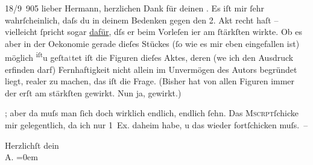 \pstart
           \raggedleft{}{\pb}18/9 905\pend
           \vspace{0.5em}
\pstart
           lieber Hermann, herzlichen Dank für deinen \label{K_L01549-11v}\label{K_L01549-11}. Es iſt mir{ }ſehr
               wahrſcheinlich, daſs du in deinem Bedenken gegen den 2. Akt recht haſt – vielleicht{ }ſpricht sogar \uline{dafür}, dſs er beim Vorleſen i{\geminationm}er am{ }ſtärkſten wirkte. Ob es aber in der Oekonomie
               gerade dieſes Stückes (ſo wie es mir eben eingefallen ist) \introOben{}möglich \substVorne{}\textsuperscript{iſt}\substDazwischen{}u\substHinten{} geſta\textcolor{gray}{t}tet iſt\introOben{} die Figuren dieſes Aktes, deren
                  (we{\geminationn} ich den Ausdruck erfinden darf) Fernhaftigkeit
               nicht allein im Unvermögen des Autors begründet liegt, realer zu machen, das iſt die
               Frage. (Bisher hat von allen Figuren immer der erſt am stärkſten gewirkt. Nun ja, gewirkt.)\pend
           
\pstart
           \label{K_L01549-1v}\label{K_L01549-1}; aber da{\geminationn} muſs man{ }ſich doch wirklich
               endlich, endlich{ }ſehn. Das \textsc{Mscrpt}ſchicke mir gelegentlich, da ich nur 1 Ex. daheim
               habe, u das wieder fortſchicken muſs. –\pend
           
\pstart
           Herzlichſt dein{\\[\baselineskip]}\spacefill\mbox{A.}\pend
           \leftskip=0em{}\endnumbering{}  \newcommand{\dateiname}{L01549}\newcommand{\titel}{Arthur Schnitzler an Hermann Bahr, 18. 9. 1905}\newcommand{\editorInnen}{Herausgegeben von Martin Anton Müller}
